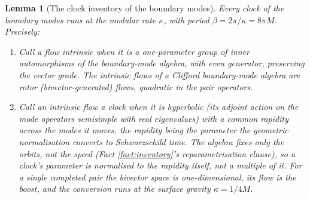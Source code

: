 \documentclass[11pt]{article}
\newtheorem{lemma}[theorem]{Lemma}
\theoremstyle{definition}
\begin{document}
\begin{lemma}[The clock inventory of the boundary modes]\label{lem:inventory}
Every clock of the boundary modes runs at the modular rate $\kappa$, with period $\beta = 2\pi/\kappa = 8\pi M$. Precisely:
\begin{enumerate}
\renewcommand{\labelenumi}{(\roman{enumi})}
\item Call a flow \emph{intrinsic} when it is a one-parameter group of inner automorphisms of the boundary-mode algebra, with even generator, preserving the vector grade. The intrinsic flows of a Clifford boundary-mode algebra are rotor (bivector-generated) flows, quadratic in the pair operators.
\item Call an intrinsic flow a \emph{clock} when it is hyperbolic (its adjoint action on the mode operators semisimple with real eigenvalues) with a common rapidity across the modes it moves, the rapidity being the parameter the geometric normalisation converts to Schwarzschild time. The algebra fixes only the orbits, not the speed (Fact \ref{fact:inventory}'s reparametrisation clause), so a clock's parameter is normalised to the rapidity itself, not a multiple of it. For a single completed pair the bivector space is one-dimensional, its flow is the boost, and the conversion runs at the surface gravity $\kappa = 1/4M$.

\end{enumerate}
\end{lemma}
\end{document}
